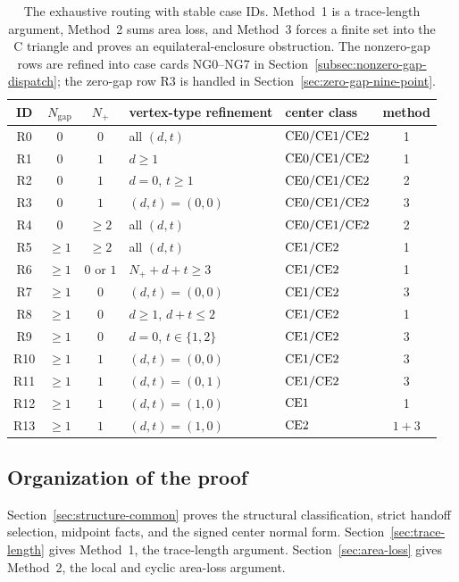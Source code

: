 \begin{table}[H]
\centering
\scriptsize
\renewcommand{\arraystretch}{1.07}
\begin{tabular}{@{}c c c p{}p{}c@{}}
\toprule
ID&$N_{\mathrm{gap}}$&$N_+$&vertex-type refinement&center class&method\\
\midrule
R0&$0$&$0$&all $(d,t)$&$\mathrm{CE0}/\mathrm{CE1}/\mathrm{CE2}$&1\\
R1&$0$&$1$&$d\ge1$&$\mathrm{CE0}/\mathrm{CE1}/\mathrm{CE2}$&1\\
R2&$0$&$1$&$d=0$, $t\ge1$&$\mathrm{CE0}/\mathrm{CE1}/\mathrm{CE2}$&2\\
R3&$0$&$1$&$(d,t)=(0,0)$&$\mathrm{CE0}/\mathrm{CE1}/\mathrm{CE2}$&3\\
R4&$0$&$\ge2$&all $(d,t)$&$\mathrm{CE0}/\mathrm{CE1}/\mathrm{CE2}$&2\\
\midrule
R5&$\ge1$&$\ge2$&all $(d,t)$&$\mathrm{CE1}/\mathrm{CE2}$&1\\
R6&$\ge1$&$0$ or $1$&$N_++d+t\ge3$&$\mathrm{CE1}/\mathrm{CE2}$&1\\
R7&$\ge1$&$0$&$(d,t)=(0,0)$&$\mathrm{CE1}/\mathrm{CE2}$&3\\
R8&$\ge1$&$0$&$d\ge1$, $d+t\le2$&$\mathrm{CE1}/\mathrm{CE2}$&1\\
R9&$\ge1$&$0$&$d=0$, $t\in\{1,2\}$&$\mathrm{CE1}/\mathrm{CE2}$&3\\
R10&$\ge1$&$1$&$(d,t)=(0,0)$&$\mathrm{CE1}/\mathrm{CE2}$&3\\
R11&$\ge1$&$1$&$(d,t)=(0,1)$&$\mathrm{CE1}/\mathrm{CE2}$&3\\
R12&$\ge1$&$1$&$(d,t)=(1,0)$&$\mathrm{CE1}$&1\\
R13&$\ge1$&$1$&$(d,t)=(1,0)$&$\mathrm{CE2}$&$1{+}3$\\
\bottomrule
\end{tabular}
\caption{The exhaustive routing with stable case IDs.  Method~1 is a
trace-length argument, Method~2 sums area loss, and Method~3 forces a finite
set into the C triangle and proves an equilateral-enclosure obstruction.
The nonzero-gap rows are refined into case cards NG0--NG7 in
Section~\ref{subsec:nonzero-gap-dispatch}; the zero-gap row R3 is handled in
Section~\ref{sec:zero-gap-nine-point}.}
\label{tab:routing}
\end{table}

\subsection{Organization of the proof}

Section~\ref{sec:structure-common} proves the structural classification,
strict handoff selection, midpoint facts, and the signed center normal form.
Section~\ref{sec:trace-length} gives Method~1, the trace-length argument.
Section~\ref{sec:area-loss} gives Method~2, the local and cyclic area-loss
argument.

